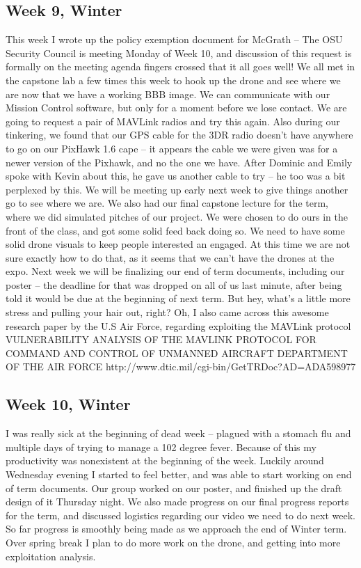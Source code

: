 \subsection{Week 9, Winter}
This week I wrote up the policy exemption document for McGrath -- The OSU Security Council is meeting Monday of Week 10, and discussion of this request is formally on the meeting agenda fingers crossed that it all goes well!
We all met in the capstone lab a few times this week to hook up the drone and see where we are now that we have a working BBB image. We can communicate with our Mission Control software, but only for a moment before we lose contact. We are going to request a pair of MAVLink radios and try this again.
Also during our tinkering, we found that our GPS cable for the 3DR radio doesn't have anywhere to go on our PixHawk 1.6 cape -- it appears the cable we were given was for a newer version of the Pixhawk, and no the one we have. After Dominic and Emily spoke with Kevin about this, he gave us another cable to try -- he too was a bit perplexed by this. We will be meeting up early next week to give things another go to see where we are.
We also had our final capstone lecture for the term, where we did simulated pitches of our project. We were chosen to do ours in the front of the class, and got some solid feed back doing so. We need to have some solid drone visuals to keep people interested an engaged. At this time we are not sure exactly how to do that, as it seems that we can't have the drones at the expo.
Next week we will be finalizing our end of term documents, including our poster -- the deadline for that was dropped on all of us last minute, after being told it would be due at the beginning of next term. But hey, what's a little more stress and pulling your hair out, right?
Oh, I also came across this awesome research paper by the U.S Air Force, regarding exploiting the MAVLink protocol
VULNERABILITY ANALYSIS OF THE MAVLINK PROTOCOL FOR COMMAND AND CONTROL OF UNMANNED AIRCRAFT
DEPARTMENT OF THE AIR FORCE
http://www.dtic.mil/cgi-bin/GetTRDoc?AD=ADA598977
\subsection{Week 10, Winter}
I was really sick at the beginning of dead week -- plagued with a stomach flu and multiple days of trying to manage a 102 degree fever. Because of this my productivity was nonexistent at the beginning of the week. Luckily around Wednesday evening I started to feel better, and was able to start working on end of term documents. Our group worked on our poster, and finished up the draft design of it Thursday night. We also made progress on our final progress reports for the term, and discussed logistics regarding our video we need to do next week. So far progress is smoothly being made as we approach the end of Winter term. Over spring break I plan to do more work on the drone, and getting into more exploitation analysis.
